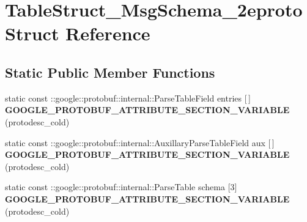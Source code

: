 \hypertarget{structTableStruct__MsgSchema__2eproto}{}\section{Table\+Struct\+\_\+\+Msg\+Schema\+\_\+2eproto Struct Reference}
\label{structTableStruct__MsgSchema__2eproto}
\subsection*{Static Public Member Functions}
\begin{DoxyCompactItemize}
\item 
\mbox{\label{structTableStruct__MsgSchema__2eproto_a9e17b991eba73579d7dacd464dfc5d88}} 
static const \+::google\+::protobuf\+::internal\+::\+Parse\+Table\+Field entries \mbox{[}$\,$\mbox{]} {\bfseries G\+O\+O\+G\+L\+E\+\_\+\+P\+R\+O\+T\+O\+B\+U\+F\+\_\+\+A\+T\+T\+R\+I\+B\+U\+T\+E\+\_\+\+S\+E\+C\+T\+I\+O\+N\+\_\+\+V\+A\+R\+I\+A\+B\+LE} (protodesc\+\_\+cold)
\item 
\mbox{\label{structTableStruct__MsgSchema__2eproto_ab49573d9af0b50a96b245e4d45a4e5c6}} 
static const \+::google\+::protobuf\+::internal\+::\+Auxillary\+Parse\+Table\+Field aux \mbox{[}$\,$\mbox{]} {\bfseries G\+O\+O\+G\+L\+E\+\_\+\+P\+R\+O\+T\+O\+B\+U\+F\+\_\+\+A\+T\+T\+R\+I\+B\+U\+T\+E\+\_\+\+S\+E\+C\+T\+I\+O\+N\+\_\+\+V\+A\+R\+I\+A\+B\+LE} (protodesc\+\_\+cold)
\item 
\mbox{\label{structTableStruct__MsgSchema__2eproto_a7d89af52e441e5a74302b6aa8a7d2807}} 
static const \+::google\+::protobuf\+::internal\+::\+Parse\+Table schema \mbox{[}3\mbox{]} {\bfseries G\+O\+O\+G\+L\+E\+\_\+\+P\+R\+O\+T\+O\+B\+U\+F\+\_\+\+A\+T\+T\+R\+I\+B\+U\+T\+E\+\_\+\+S\+E\+C\+T\+I\+O\+N\+\_\+\+V\+A\+R\+I\+A\+B\+LE} (protodesc\+\_\+cold)
\end{DoxyCompactItemize}
